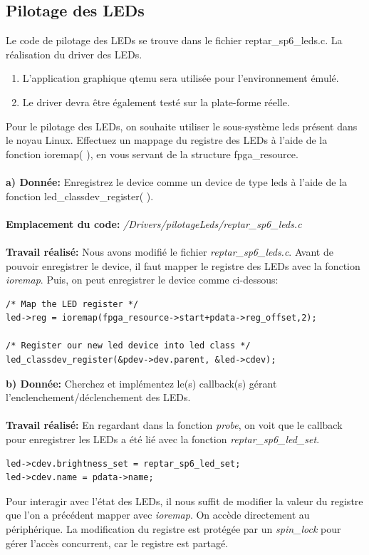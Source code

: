 \subsection{Pilotage des LEDs }
Le code de pilotage des LEDs se trouve dans le fichier reptar\_sp6\_leds.c. La réalisation du driver des
LEDs.
\begin{enumerate}
	\item L’application graphique qtemu sera utilisée pour l'environnement émulé.
	\item Le driver devra être également testé sur la plate-forme réelle.
\end{enumerate}
Pour le pilotage des LEDs, on souhaite utiliser le sous-système leds présent dans le noyau Linux.
Effectuez un mappage du registre des LEDs à l'aide de la fonction ioremap( ), en vous servant de la
structure fpga\_resource.\\\\
\textbf{a) Donnée: }Enregistrez le device comme un device de type leds à l'aide de la fonction led\_classdev\_register( ).\\\\
\textbf{Emplacement du code: }\textit{/Drivers/pilotageLeds/reptar\_sp6\_leds.c}\\\\
\textbf{Travail réalisé: }Nous avons modifié le fichier \textit{reptar\_sp6\_leds.c}. Avant de pouvoir enregistrer le device, il faut mapper le registre des LEDs avec la fonction \textit{ioremap}. Puis, on peut enregistrer le device comme ci-dessous:
\begin{lstlisting}
/* Map the LED register */
led->reg = ioremap(fpga_resource->start+pdata->reg_offset,2);

/* Register our new led device into led class */
led_classdev_register(&pdev->dev.parent, &led->cdev);
\end{lstlisting}
\textbf{b) Donnée: }Cherchez et implémentez le(s) callback(s) gérant l'enclenchement/déclenchement des LEDs.\\\\
\textbf{Travail réalisé: }En regardant dans la fonction \textit{probe}, on voit que le callback pour enregistrer les LEDs a été lié avec la fonction \textit{reptar\_sp6\_led\_set}.
\begin{lstlisting}
led->cdev.brightness_set = reptar_sp6_led_set;
led->cdev.name = pdata->name;
\end{lstlisting}
Pour interagir avec l'état des LEDs, il nous suffit de modifier la valeur du registre que l'on a précédent mapper avec \textit{ioremap}. On accède directement au périphérique. La modification du registre est protégée par un \textit{spin\_lock} pour gérer l'accès concurrent, car le registre est partagé.
